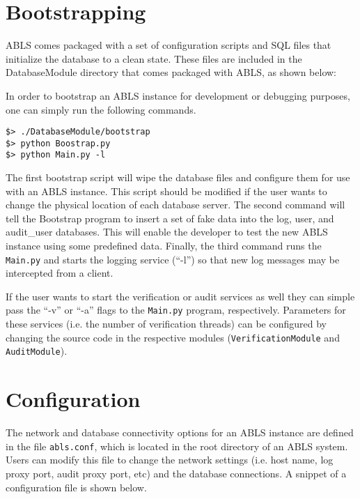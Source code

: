 \section{Bootstrapping}

ABLS comes packaged with a set of configuration scripts and SQL files that initialize
the database to a clean state. These files are included in the DatabaseModule directory
that comes packaged with ABLS, as shown below:


In order to bootstrap an ABLS instance for development or debugging purposes, one can simply run the 
following commands.

\begin{lstlisting}
$> ./DatabaseModule/bootstrap 
$> python Boostrap.py
$> python Main.py -l
\end{lstlisting}

The first bootstrap script will wipe the database files and configure them for use with an 
ABLS instance. This script should be modified if the user wants to change the physical
location of each database server. The second command will tell the Bootstrap program
to insert a set of fake data into the log, user, and audit\_user databases. This will enable
the developer to test the new ABLS instance using some predefined data. Finally, the third
command runs the {\tt Main.py} and starts the logging service (``-l'') so that new log messages
may be intercepted from a client.

If the user wants to start the verification or audit services as well they can simple pass the ``-v'' or
``-a'' flags to the {\tt Main.py} program, respectively. Parameters for these services (i.e. the number of 
verification threads) can be configured by changing the source code in the respective modules
({\tt VerificationModule} and {\tt AuditModule}).

\section{Configuration}

The network and database connectivity options for an ABLS instance are defined in the file {\tt abls.conf}, which
is located in the root directory of an ABLS system. Users can modify this file to change the network settings (i.e. 
host name, log proxy port, audit proxy port, etc) and the database connections. A snippet of a configuration file
is shown below.

